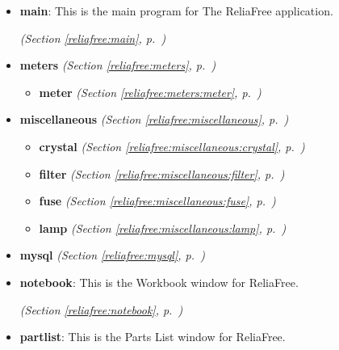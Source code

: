 \begin{itemize}
\item \textbf{main}: This is the main program for The ReliaFree application.



  \textit{(Section \ref{reliafree:main}, p.~\pageref{reliafree:main})}

\item \textbf{meters}
  \textit{(Section \ref{reliafree:meters}, p.~\pageref{reliafree:meters})}

  \begin{itemize}
\setlength{\parskip}{0ex}
    \item \textbf{meter}
  \textit{(Section \ref{reliafree:meters:meter}, p.~\pageref{reliafree:meters:meter})}

  \end{itemize}
\item \textbf{miscellaneous}
  \textit{(Section \ref{reliafree:miscellaneous}, p.~\pageref{reliafree:miscellaneous})}

  \begin{itemize}
\setlength{\parskip}{0ex}
    \item \textbf{crystal}
  \textit{(Section \ref{reliafree:miscellaneous:crystal}, p.~\pageref{reliafree:miscellaneous:crystal})}

    \item \textbf{filter}
  \textit{(Section \ref{reliafree:miscellaneous:filter}, p.~\pageref{reliafree:miscellaneous:filter})}

    \item \textbf{fuse}
  \textit{(Section \ref{reliafree:miscellaneous:fuse}, p.~\pageref{reliafree:miscellaneous:fuse})}

    \item \textbf{lamp}
  \textit{(Section \ref{reliafree:miscellaneous:lamp}, p.~\pageref{reliafree:miscellaneous:lamp})}

  \end{itemize}
\item \textbf{mysql}
  \textit{(Section \ref{reliafree:mysql}, p.~\pageref{reliafree:mysql})}

\item \textbf{notebook}: This is the Workbook window for ReliaFree.



  \textit{(Section \ref{reliafree:notebook}, p.~\pageref{reliafree:notebook})}

\item \textbf{partlist}: This is the Parts List window for ReliaFree.




\end{itemize}
